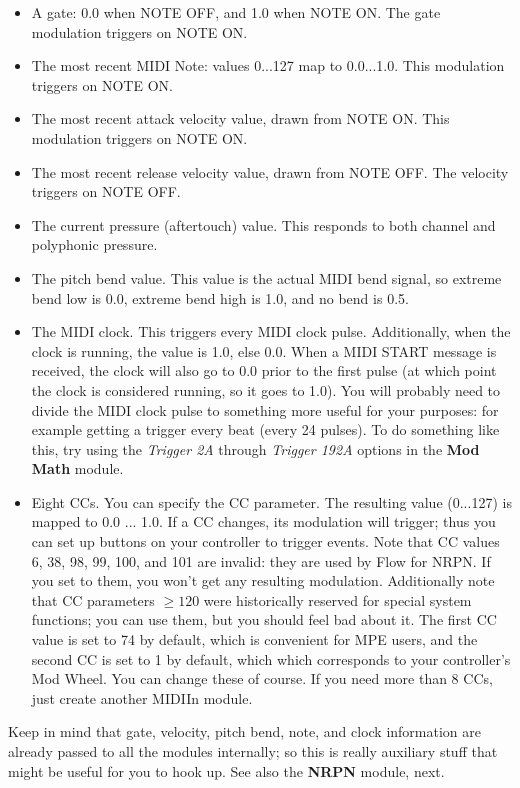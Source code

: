 \documentclass{article}
\newcommand\name{Flow}
\begin{document}
\begin{itemize}
\item A gate: 0.0 when NOTE OFF, and 1.0 when NOTE ON.  The gate modulation triggers on NOTE ON.
\item The most recent MIDI Note: values 0...127 map to 0.0...1.0.  This modulation triggers on NOTE ON.
\item The most recent attack velocity value, drawn from NOTE ON. This modulation triggers on NOTE ON.
\item The most recent release velocity value, drawn from NOTE OFF.  The velocity triggers on NOTE OFF.
\item The current pressure (aftertouch) value.  This responds to both channel and polyphonic pressure.
\item The pitch bend value.  This value is the actual MIDI bend signal, so extreme bend low is 0.0, extreme bend high is 1.0, and no bend is 0.5.
\item The MIDI clock.  This triggers every MIDI clock pulse.  Additionally, when the clock is running, the value is 1.0, else 0.0.  When a MIDI START message is received, the clock will also go to 0.0 prior to the first pulse (at which point the clock is considered running, so it goes to 1.0).  You will probably need to divide the MIDI clock pulse to something more useful for your purposes: for example getting a trigger every beat (every 24 pulses).  To do something like this, try using the {\it Trigger 2A} through {\it Trigger 192A} options in the {\bf Mod Math} module.
\item Eight CCs.  You can specify the CC parameter.  The resulting value (0...127) is mapped to 0.0 ... 1.0.  If a CC changes, its modulation will trigger; thus you can set up buttons on your controller to trigger events. Note that CC values 6, 38, 98, 99, 100, and 101 are invalid: they are used by {\name} for NRPN.  If you set to them, you won't get any resulting modulation.  Additionally note that CC parameters \(\geq 120\) were historically reserved for special system functions; you can use them, but you should feel bad about it.   The first CC value is set to 74 by default, which is convenient for MPE users, and the second CC is set to 1 by default, which which corresponds to your controller's Mod Wheel.  You can change these of course.  If you need more than 8 CCs, just create another MIDIIn module.
\end{itemize}

Keep in mind that gate, velocity, pitch bend, note, and clock information are already passed to all the modules internally; so this is really auxiliary stuff that might be useful for you to hook up.   See also the {\bf NRPN} module, next.
\end{document}
